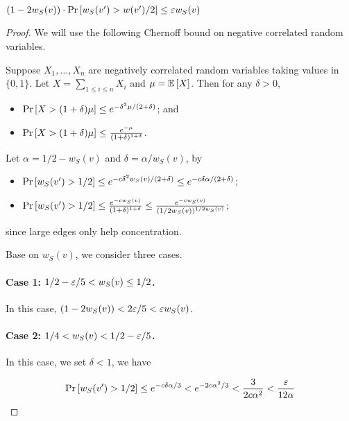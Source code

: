 \begin{claim}
$(1-2w_S(v)) \cdot \mathrm{Pr}\left[ w_S(v')>w(v')/2 \right] \le {\varepsilon} w_S(v)$
\end{claim}
\begin{proof}
We will use the following Chernoff bound on negative correlated random variables.

    \begin{lemma}  \label{chernoff}
	Suppose $X_1,\dots,X_n$ are negatively correlated random variables taking values in $\{0,1\}$. Let $X=\sum_{1\le  i\le n}X_i$ and $\mu={\mathbb{E}}\left[ X \right]$. Then for any $\delta>0$,
	\begin{itemize}
		\item $\mathrm{Pr}\left[ X > (1+\delta)\mu \right] \le e^{-\delta^2 \mu / (2+\delta)}$; and
		\item $\mathrm{Pr}\left[ X > (1+\delta)\mu \right] \le \frac{e^{-\mu}}{(1+\delta)^{1+\delta}}$.
	\end{itemize}
\end{lemma}
Let $\alpha = 1/2 - w_S(v)$ and $\delta = \alpha/w_S(v)$, by 

\begin{itemize}
    \item $\mathrm{Pr}\left[ w_S(v') > 1/2 \right] \le e^{-c \delta^2 w_S(v) / (2+\delta)} \le e^{-c \delta \alpha / (2+\delta)}$;
    \item $\mathrm{Pr}\left[ w_S(v') > 1/2 \right] \le \frac{e^{-c w_S(v)}}{(1+\delta)^{1+\delta}} \le \frac{e^{-c w_S(v)}}{(1/2w_S(v))^{1/2w_S(v)}}$;
\end{itemize}

since large edges only help concentration.

Base on $w_S(v)$, we consider three cases. 

\paragraph{Case 1: $1/2 - {\varepsilon}/5 < w_S(v) \le 1/2$.} In this case, $(1-2w_S(v))<2{\varepsilon}/5<{\varepsilon} w_S(v)$.

\paragraph{Case 2: $1/4 < w_S(v) < 1/2 - {\varepsilon}/5$.} In this case, we set $\delta < 1$, we have 

\begin{align*}
    \mathrm{Pr}\left[ w_S(v') > 1/2 \right] \le e^{-c \delta \alpha / 3} < e^{- 2 c \alpha^2 / 3} < \frac{3}{2 c \alpha^2} < \frac{{\varepsilon}}{12\alpha}
\end{align*}


\end{proof}
